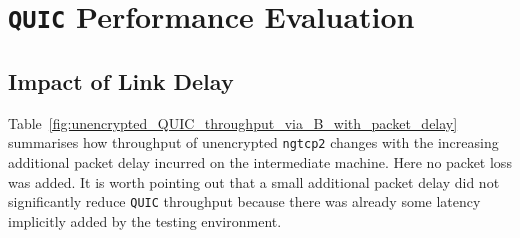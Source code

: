 \documentclass[12pt,a4paper]{report}
\newcommand\note[2]{{\color{#1}\bf #2}}
\newcommand\simon[1]{\ifcomments{\note{cyan}{SM: #1}}\fi}
\begin{document}






\section{\texttt{QUIC} Performance Evaluation}


\subsection{Impact of Link Delay}

Table~\ref{fig:unencrypted_QUIC_throughput_via_B_with_packet_delay} summarises how throughput of unencrypted \texttt{ngtcp2} changes with the increasing additional packet delay incurred on the intermediate machine.
Here no packet loss was added.
It is worth pointing out that a small additional packet delay did not significantly reduce \texttt{QUIC} throughput because there was already some latency implicitly added by the testing environment.
\end{document}
